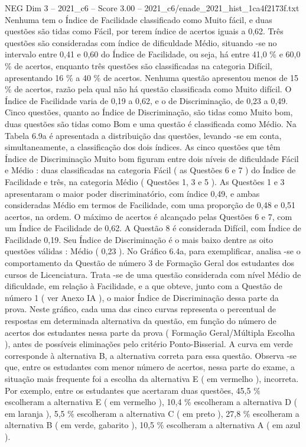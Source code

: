 \begin{textsample}{NEG Dim 3 – 2021\_c6 – Score 3.00 – 2021\_c6/enade\_2021\_hist\_1ca4f2173f.txt}
Nenhuma tem o Índice de Facilidade classificado como Muito fácil, e duas questões são tidas como Fácil, por terem índice de acertos iguais a 0,62.
Três questões são consideradas com índice de dificuldade Médio, situando -se no intervalo entre 0,41 e 0,60 do Índice de Facilidade, ou seja, há entre 41,0 \% e 60,0 \% de acertos, enquanto três questões são classificadas na categoria Difícil, apresentando 16 \% a 40 \% de acertos.
Nenhuma questão apresentou menos de 15 \% de acertos, razão pela qual não há questão classificada como Muito difícil.
O Índice de Facilidade varia de 0,19 a 0,62, e o de Discriminação, de 0,23 a 0,49.
Cinco questões, quanto ao Índice de Discriminação, são tidas como Muito bom, duas questões são tidas como Bom e uma questão é classificada como Médio.
Na Tabela 6.9a é apresentada a distribuição das questões, levando -se em conta, simultaneamente, a classificação dos dois índices.
As cinco questões que têm Índice de Discriminação Muito bom figuram entre dois níveis de dificuldade Fácil e Médio : duas classificadas na categoria Fácil ( as Questões 6 e 7 ) do Índice de Facilidade e três, na categoria Médio ( Questões 1, 3 e 5 ).
As Questões 1 e 3 apresentaram o maior poder discriminatório, com índice 0,49, e ambas consideradas Médio em termos de Facilidade, com uma proporção de 0,48 e 0,51 acertos, na ordem.
O máximo de acertos é alcançado pelas Questões 6 e 7, com um Índice de Facilidade de 0,62.
A Questão 8 é considerada Difícil, com Índice de Facilidade 0,19.
Seu Índice de Discriminação é o mais baixo dentre as oito questões válidas : Médio ( 0,23 ).
No Gráfico 6.4a, para exemplificar, analisa -se o comportamento da Questão de número 3 de Formação Geral dos estudantes dos cursos de Licenciatura.
Trata -se de uma questão considerada com nível Médio de dificuldade, em relação à Facilidade, e a que obteve, junto com a Questão de número 1 ( ver Anexo IA ), o maior Índice de Discriminação dessa parte da prova.
Neste gráfico, cada uma das cinco curvas representa o percentual de respostas em determinada alternativa da questão, em função do número de acertos dos estudantes nessa parte da prova ( Formação Geral/Múltipla Escolha ), antes de possíveis eliminações pelo critério Ponto-Bisserial.
A curva em verde corresponde à alternativa B, a alternativa correta para essa questão.
Observa -se que, entre os estudantes com menor número de acertos, nessa parte do exame, a situação mais frequente foi a escolha da alternativa E ( em vermelho ), incorreta.
Por exemplo, entre os estudantes que acertaram duas questões, 45,5 \% escolheram a alternativa E ( em vermelho ), 10,4 \% escolheram a alternativa D ( em laranja ), 5,5 \% escolheram a alternativa C ( em preto ), 27,8 \% escolheram a alternativa B ( em verde, gabarito ), 10,5 \% escolheram a alternativa A ( em azul ).

\end{textsample}

